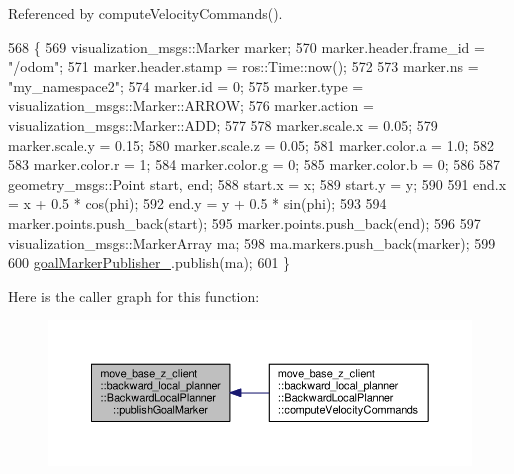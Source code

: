 Referenced by compute\+Velocity\+Commands().


\begin{DoxyCode}
568 \{
569     visualization\_msgs::Marker marker;
570     marker.header.frame\_id = \textcolor{stringliteral}{"/odom"};
571     marker.header.stamp = ros::Time::now();
572 
573     marker.ns = \textcolor{stringliteral}{"my\_namespace2"};
574     marker.id = 0;
575     marker.type = visualization\_msgs::Marker::ARROW;
576     marker.action = visualization\_msgs::Marker::ADD;
577 
578     marker.scale.x = 0.05;
579     marker.scale.y = 0.15;
580     marker.scale.z = 0.05;
581     marker.color.a = 1.0;
582 
583     marker.color.r = 1;
584     marker.color.g = 0;
585     marker.color.b = 0;
586 
587     geometry\_msgs::Point start, end;
588     start.x = x;
589     start.y = y;
590 
591     end.x = x + 0.5 * cos(phi);
592     end.y = y + 0.5 * sin(phi);
593 
594     marker.points.push\_back(start);
595     marker.points.push\_back(end);
596 
597     visualization\_msgs::MarkerArray ma;
598     ma.markers.push\_back(marker);
599 
600     \hyperlink{classmove__base__z__client_1_1backward__local__planner_1_1BackwardLocalPlanner_a7228d3fe90bc48b486e5c46d6ac5e815}{goalMarkerPublisher\_}.publish(ma);
601 \}
\end{DoxyCode}


Here is the caller graph for this function\+:\nopagebreak
\begin{figure}[H]
\begin{center}
\leavevmode
\includegraphics[width=350pt]{classmove__base__z__client_1_1backward__local__planner_1_1BackwardLocalPlanner_a691e565d33666d2f7004e791cae29b42_icgraph}
\end{center}
\end{figure}


